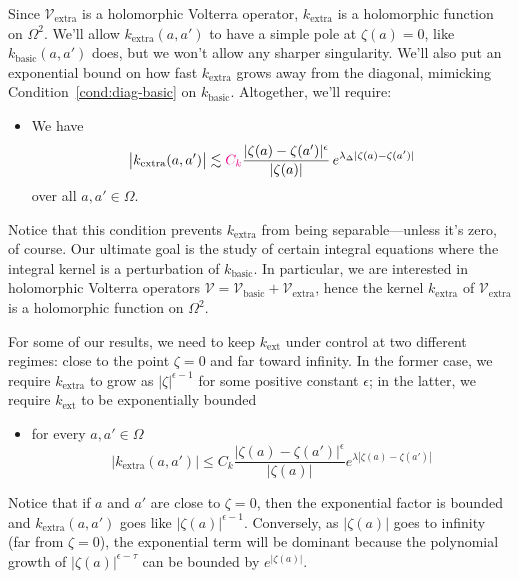 \documentclass{article}
\makeatletter
\theoremstyle{plain}
\newcommand{\condconst}[2]{\item[($\text{\textsc{#1}} \mid #2$)]\protected@edef\@currentlabel{$\text{\textsc{#1}} \mid #2$}}
\newcommand{\volterra}{\mathcal{V}}
\newcommand{\hardpart}{\mathcal{V}_\text{basic}}
\newcommand{\softpart}{\mathcal{V}_\text{extra}}
\newcommand{\hardker}{k_\text{basic}}
\newcommand{\softker}{k_\text{extra}}
\newcommand{\domain}{\Omega}
\makeatother
\begin{document}
Since $\softpart$ is a holomorphic Volterra operator, $\softker$ is a holomorphic function on $\domain^2$. We'll allow $\softker(a, a')$ to have a simple pole at $\zeta(a) = 0$, like $\hardker(a, a')$ does, but we won't allow any sharper singularity. We'll also put an exponential bound on how fast $\softker$ grows away from the diagonal, mimicking Condition~\eqref{cond:diag-basic} on $\hardker$. Altogether, we'll require:
\begin{itemize}
\condconst{diag}{\epsilon, \lambda_\Delta}\label{cond:eps-lambda} We have
\[ \big| k_\text{extra} (a, a') \big| \lesssim \textcolor{magenta}{C_k}\frac{|\zeta(a)-\zeta(a')|^\epsilon}{|\zeta(a)|}\,e^{\lambda_\Delta|\zeta(a)-\zeta(a')|}\]
over all $a, a' \in \domain$.
\end{itemize}
Notice that this condition prevents $\softker$ from being separable---unless it's zero, of course.
\color{RoyalBlue}
Our ultimate goal is the study of certain integral equations where the integral kernel is a perturbation of $k_\text{basic}$. In particular, we are interested in holomorphic Volterra operators $\volterra=\hardpart+\softpart$, hence the kernel $k_\text{extra}$ of $\softpart$ is a holomorphic function on $\Omega^2$.  

For some of our results, we need to keep $k_\text{ext}$ under control at two different regimes: close to the point $\zeta=0$ and far toward infinity. In the former case, we require $k_\text{extra}$ to grow as $|\zeta|^{\epsilon-1}$ for some positive constant $\epsilon$; in the latter, we require $k_\text{ext}$ to be exponentially bounded
\begin{itemize}
\condconst{bounds}{\epsilon, \lambda}%
for every $a,a'\in\Omega$
\[ \big| k_\text{extra} (a, a') \big|\le C_{k}\frac{|\zeta(a)-\zeta(a')|^\epsilon}{|\zeta(a)|} e^{\lambda|\zeta(a)-\zeta(a')|}\]
\end{itemize}

Notice that if $a$ and $a'$ are close to $\zeta=0$, then the exponential factor is bounded and $k_\text{extra}(a,a')$ goes like $|\zeta(a)|^{\epsilon-1}$. Conversely, as $|\zeta(a)|$ goes to infinity (far from $\zeta=0$), the exponential term will be dominant because the polynomial growth of $|\zeta(a)|^{\epsilon-\tau}$ can be bounded by $e^{|\zeta(a)|}$.
\color{black}
\end{document}
